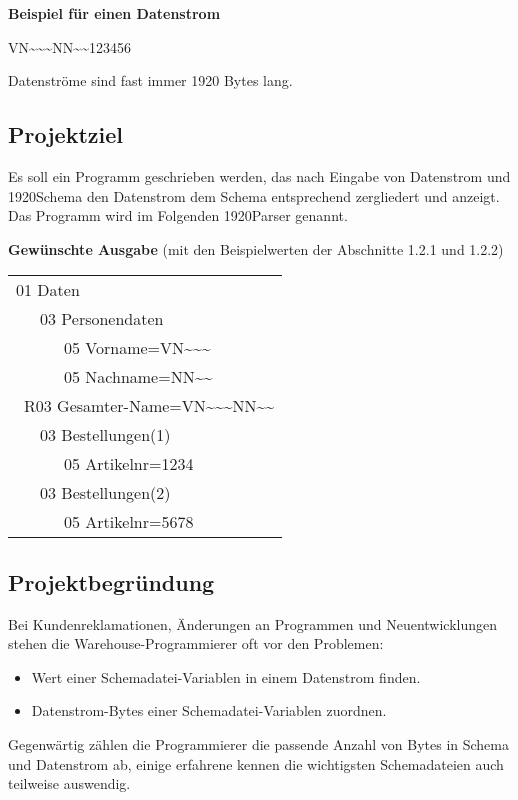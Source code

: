 \textbf{Beispiel für einen Datenstrom}

VN\textasciitilde \textasciitilde \textasciitilde NN\textasciitilde\textasciitilde123456

Datenströme sind fast immer 1920 Bytes lang.


\subsection{Projektziel}
\label{sec:Projektziel}
Es soll ein Programm geschrieben werden, das nach Eingabe von Datenstrom und 1920Schema den Datenstrom dem Schema entsprechend zergliedert und anzeigt. Das Programm wird im Folgenden 1920Parser genannt.

\textbf{Gewünschte Ausgabe} (mit den Beispielwerten der Abschnitte 1.2.1 und 1.2.2)

\begin{tabularx}{0px}{l}
01 Daten\\
\ \ \ 03 Personendaten\\
\ \ \ \ \ \ 05 Vorname=VN\textasciitilde \textasciitilde \textasciitilde\\
\ \ \ \ \ \ 05 Nachname=NN\textasciitilde \textasciitilde\\
\ R03 Gesamter-Name=VN\textasciitilde \textasciitilde \textasciitilde NN\textasciitilde \textasciitilde\\
\ \ \ 03 Bestellungen(1)\\
\ \ \ \ \ \ 05 Artikelnr=1234\\
\ \ \ 03 Bestellungen(2)\\
\ \ \ \ \ \ 05 Artikelnr=5678\\
\end{tabularx}

\subsection{Projektbegründung}
\label{sec:Projektbegruendung}
Bei Kundenreklamationen, Änderungen an Programmen und Neuentwicklungen stehen die Warehouse-Programmierer oft vor den Problemen:

\begin{itemize}
\item Wert einer Schemadatei-Variablen in einem Datenstrom finden.
\item Datenstrom-Bytes einer Schemadatei-Variablen zuordnen.
\end{itemize}

Gegenwärtig zählen die Programmierer die passende Anzahl von Bytes in Schema und Datenstrom ab, einige erfahrene kennen die wichtigsten Schemadateien auch teilweise auswendig. 


